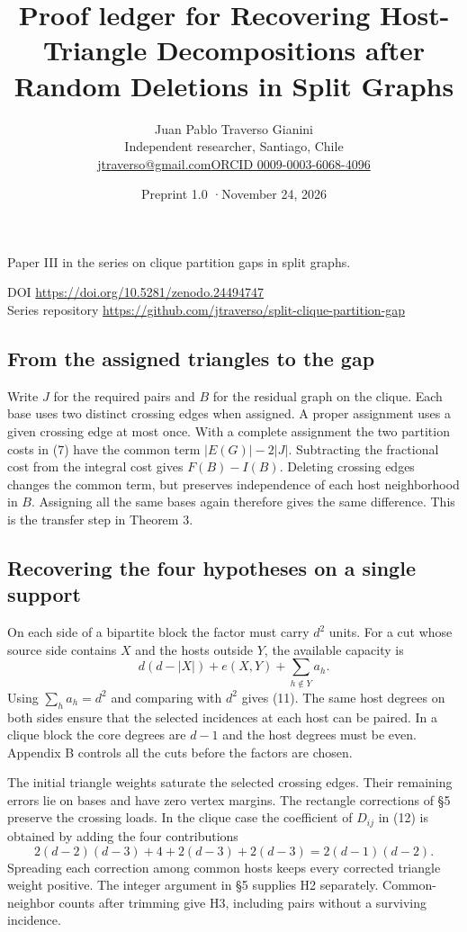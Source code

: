 \documentclass[english,11pt,a4paper]{article}
\title{Proof ledger for Recovering Host-Triangle Decompositions after Random Deletions in Split Graphs}
\author{Juan Pablo Traverso Gianini\\\small Independent researcher, Santiago, Chile\\\small\href{mailto:jtraverso@gmail.com}{jtraverso@gmail.com}\quad\href{https://orcid.org/0009-0003-6068-4096}{ORCID 0009-0003-6068-4096}}
\date{Preprint 1.0 \enspace·\enspace November 24, 2026}
\begin{document}
\raggedbottom\maketitle
\begin{center}Paper III in the series on clique partition gaps in split graphs.\end{center}
\noindent DOI \url{https://doi.org/10.5281/zenodo.24494747}\\
Series repository \url{https://github.com/jtraverso/split-clique-partition-gap}
\subsection{From the assigned triangles to the gap}\label{from-the-assigned-triangles-to-the-gap}

Write \(J\) for the required pairs and \(B\) for the residual graph on the clique. Each base uses two distinct crossing edges when assigned. A proper assignment uses a given crossing edge at most once. With a complete assignment the two partition costs in (7) have the common term \(|E(G)|-2|J|\). Subtracting the fractional cost from the integral cost gives \(F(B)-I(B)\). Deleting crossing edges changes the common term, but preserves independence of each host neighborhood in \(B\). Assigning all the same bases again therefore gives the same difference. This is the transfer step in Theorem 3.

\subsection{Recovering the four hypotheses on a single support}\label{recovering-the-four-hypotheses-on-a-single-support}

On each side of a bipartite block the factor must carry \(d^2\) units. For a cut whose source side contains \(X\) and the hosts outside \(Y\), the available capacity is \[d(d-|X|)+e(X,Y)+\sum_{h\notin Y}a_h.\] Using \(\sum_h a_h=d^2\) and comparing with \(d^2\) gives (11). The same host degrees on both sides ensure that the selected incidences at each host can be paired. In a clique block the core degrees are \(d-1\) and the host degrees must be even. Appendix B controls all the cuts before the factors are chosen.

The initial triangle weights saturate the selected crossing edges. Their remaining errors lie on bases and have zero vertex margins. The rectangle corrections of §5 preserve the crossing loads. In the clique case the coefficient of \(D_{ij}\) in (12) is obtained by adding the four contributions \[2(d-2)(d-3)+4+2(d-3)+2(d-3)=2(d-1)(d-2).\] Spreading each correction among common hosts keeps every corrected triangle weight positive. The integer argument in §5 supplies H2 separately. Common-neighbor counts after trimming give H3, including pairs without a surviving incidence.
\end{document}
